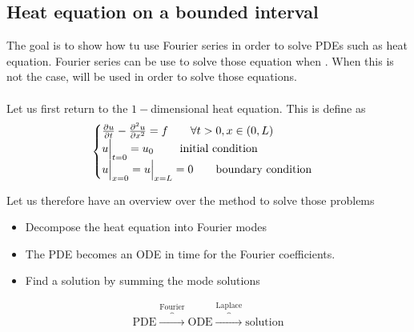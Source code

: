 \subsection{Heat equation on a bounded interval}

The goal is to show how tu use Fourier series in order to solve PDEs such as heat equation. Fourier series can be use to solve those equation when . When this is not the case,  will be used in order to solve those equations.\\
$ $\\
Let us first return to the $1-$dimensional heat equation. This is define as 
\begin{align*} 
	\begin{cases}
		\frac{\partial u}{\partial t}  - \frac{\partial^2 u}{\partial x^2} = f \mathspace \mathspace \forall t > 0, x \in \left(0, L\right)\\
		u \eval_{t= 0} =  u_0 \mathspace \mathspace \text{ initial condition}\\
		u \eval_{x= 0} =  u \eval_{x = L} = 0 \mathspace \mathspace \text{boundary condition}
	\end{cases} 
\end{align*}

Let us therefore have an overview over the method to solve those problems 
\begin{itemize}
	\item Decompose the heat equation into Fourier modes
	\item The PDE becomes an ODE in time for the Fourier coefficients. 
	\item Find a solution by summing the mode solutions
\end{itemize}

\begin{align*} 
	\text{PDE} \overbrace{\longrightarrow}^{\text{Fourier}}  \text{ODE} \overbrace{\longrightarrow}^{\text{Laplace}}  \text{solution}
\end{align*}


